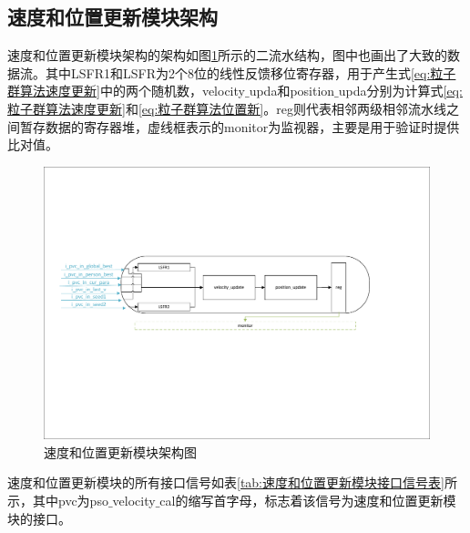\subsection{速度和位置更新模块架构}
速度和位置更新模块架构的架构如图\ref{fig:速度和位置更新模块架构图}所示的二流水结构，图中也画出了大致的数据流。其中LSFR1和LSFR为2个8位的线性反馈移位寄存器，用于产生式\eqref{eq:粒子群算法速度更新}中的两个随机数，velocity$\_$upda和position$\_$upda分别为计算式\eqref{eq:粒子群算法速度更新}和\eqref{eq:粒子群算法位置新}。reg则代表相邻两级相邻流水线之间暂存数据的寄存器堆，虚线框表示的monitor为监视器，主要是用于验证时提供比对值。
\begin{figure}[htb]
    \centering
    \includegraphics[width=14cm]{fig/5-fig/速度和位置更新模块架构图.pdf}
    \caption{速度和位置更新模块架构图}
    \label{fig:速度和位置更新模块架构图}
\end{figure}

速度和位置更新模块的所有接口信号如表\ref{tab:速度和位置更新模块接口信号表}所示，其中pvc为pso$\_$velocity$\_$cal的缩写首字母，标志着该信号为速度和位置更新模块的接口。

